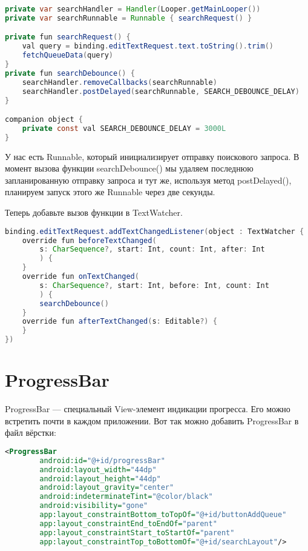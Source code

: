 \begin{lstlisting}[language=Java]
private var searchHandler = Handler(Looper.getMainLooper())
private var searchRunnable = Runnable { searchRequest() }

private fun searchRequest() {
	val query = binding.editTextRequest.text.toString().trim()
	fetchQueueData(query)
}
private fun searchDebounce() {
	searchHandler.removeCallbacks(searchRunnable)
	searchHandler.postDelayed(searchRunnable, SEARCH_DEBOUNCE_DELAY)
}

companion object {
	private const val SEARCH_DEBOUNCE_DELAY = 3000L
}
\end{lstlisting}

У нас есть Runnable, который инициализирует отправку поискового запроса.
В момент вызова функции searchDebounce() мы удаляем последнюю
запланированную отправку запроса и тут же, используя метод postDelayed(),
планируем запуск этого же Runnable через две секунды.\par
Теперь добавьте вызов функции в TextWatcher.

\begin{lstlisting}[language=Java]
binding.editTextRequest.addTextChangedListener(object : TextWatcher {
	override fun beforeTextChanged(
		s: CharSequence?, start: Int, count: Int, after: Int
		) {
	}
	override fun onTextChanged(
		s: CharSequence?, start: Int, before: Int, count: Int
		) {
		searchDebounce()
	}
	override fun afterTextChanged(s: Editable?) {
	}
})
\end{lstlisting}

\section{ProgressBar}
ProgressBar --- специальный View-элемент индикации прогресса. Его можно
встретить почти в каждом приложении.
Вот так можно добавить ProgressBar в файл вёрстки:

\begin{lstlisting}[language=XML]
<ProgressBar
        android:id="@+id/progressBar"
        android:layout_width="44dp"
        android:layout_height="44dp"
        android:layout_gravity="center"
        android:indeterminateTint="@color/black"
        android:visibility="gone"
        app:layout_constraintBottom_toTopOf="@+id/buttonAddQueue"
        app:layout_constraintEnd_toEndOf="parent"
        app:layout_constraintStart_toStartOf="parent"
        app:layout_constraintTop_toBottomOf="@+id/searchLayout"/>
\end{lstlisting}

